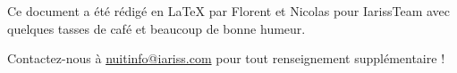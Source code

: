 \documentclass[12pt, a4paper]{article}
\newcommand{\espace}{\vspace{.8cm}}
\newcommand{\authors}{Florent et Nicolas}
\begin{document}

\espace\vfill{}
Ce document a été rédigé en \LaTeX{} par \authors{} pour IarissTeam avec quelques tasses de café et beaucoup de bonne humeur.

Contactez-nous à \href{mailto:nuitinfo@iariss.com}{nuitinfo@iariss.com} pour tout renseignement supplémentaire !
\end{document}
